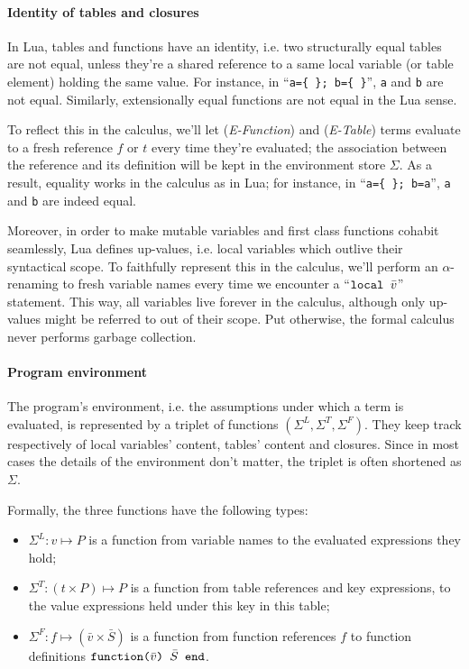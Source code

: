 \paragraph{Identity of tables and closures}
In Lua, tables and functions have an identity, i.e. two structurally
equal tables are not equal, unless they're a shared reference to a
same local variable (or table element) holding the same value.  For
instance, in ``{\tt a=\{ \}; b=\{ \}}'', {\tt a} and {\tt b} are not
equal. Similarly, extensionally equal functions are not equal in the
Lua sense.

To reflect this in the calculus, we'll let ({\it E-Function}) and
({\it E-Table}) terms evaluate to a fresh reference $f$ or $t$ every
time they're evaluated; the association between the reference and its
definition will be kept in the environment store $\Sigma$. As a result,
equality works in the calculus as in Lua; for instance, in ``{\tt a=\{
  \}; b=a}'', {\tt a} and {\tt b} are indeed equal.

Moreover, in order to make mutable variables and first class functions
cohabit seamlessly, Lua defines up-values, i.e. local variables which
outlive their syntactical scope. To faithfully represent this in the
calculus, we'll perform an $\alpha$-renaming to fresh variable names
every time we encounter a ``$\texttt{local\ }\bar v$'' statement. This way,
all variables live forever in the calculus, although only up-values
might be referred to out of their scope. Put otherwise, the formal
calculus never performs garbage collection.

\paragraph{Program environment}
The program's environment, i.e. the assumptions under which a term is
evaluated, is represented by a triplet of functions $(\Sigma^L,
\Sigma^T, \Sigma^F)$. They keep track respectively of local variables'
content, tables' content and closures. Since in most cases the details
of the environment don't matter, the triplet is often shortened as
$\Sigma$.

Formally, the three functions have the following types:
\begin{itemize}
\item $\Sigma^L: v \mapsto P$ is a function from variable names 
  to the evaluated expressions they hold;
\item $\Sigma^T: (t\times P) \mapsto P$ is a function from
  table references and key expressions, to the value expressions held
  under this key in this table;
\item $\Sigma^F: f \mapsto (\bar v \times \bar S)$ is a function from
  function references $f$ to function definitions $\texttt{function(}\bar
    v\texttt{)\ }\bar S\texttt{\ end}$.
\end{itemize}

